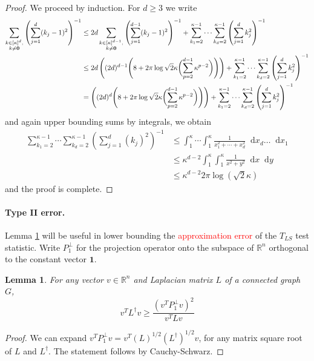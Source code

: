 \documentclass{article}
\newcommand{\Reals}{\mathbb{R}}
\newcommand{\1}{\mathbb{I}}
\newcommand{\Linv}{L^{\dagger}}
\newcommand{\dif}{\mathop{}\!\mathrm{d}}
\theoremstyle{alden}
\theoremstyle{aldenthm}
\newtheorem{lemma}{Lemma}
\theoremstyle{definition}
\theoremstyle{remark}
\begin{document}
\begin{proof}
	We proceed by induction. For $d \geq 3$ we write
	\begin{align*}
	\sum_{\substack{k \in [\kappa]^d, \\ k \neq \bf{0}}} \left(\sum_{j = 1}^{d} (k_j - 1)^2\right)^{-1} & \leq 2d \sum_{\substack{k \in [\kappa]^{d - 1}, \\ k \neq \bf{0}}} \left(\sum_{j = 1}^{d - 1} (k_j - 1)^2\right)^{-1} + \sum_{k_1 = 2}^{\kappa - 1} \cdots \sum_{k_d = 2}^{\kappa - 1} \left(\sum_{j = 1}^{d} k_j^2\right)^{-1} \\
	& \leq 2d \left( (2d)^{d - 1}\Biggl(8 + 2 \pi \log \sqrt{2} \kappa \biggl(\sum_{p = 2}^{d - 1} \kappa^{p - 2}\biggr) \Biggr)\right) + \sum_{k_1 = 2}^{\kappa - 1} \cdots \sum_{k_d = 2}^{\kappa - 1} \left(\sum_{j = 1}^{d} k_j^2\right)^{-1} \\
	& = \left( (2d)^{d}\Biggl(8 + 2 \pi \log \sqrt{2} \kappa \biggl(\sum_{p = 2}^{d - 1} \kappa^{p - 2}\biggr) \Biggr)\right) + \sum_{k_1 = 2}^{\kappa - 1} \cdots \sum_{k_d = 2}^{\kappa - 1} \left(\sum_{j = 1}^{d} k_j^2\right)^{-1} 
	\end{align*}
	and again upper bounding sums by integrals, we obtain
	\begin{align*}
	\sum_{k_1 = 2}^{\kappa - 1} \cdots \sum_{k_d = 2}^{\kappa - 1} \left(\sum_{j = 1}^{d} (k_j)^2\right)^{-1} & \leq \int_{1}^{\kappa} \cdots \int_{1}^{\kappa} \frac{1}{x_1^2 + \cdots + x_d^2} \dif x_d \ldots \dif x_1 \\
	& \leq \kappa^{d-2} \int_{1}^{\kappa} \int_{1}^{\kappa} \frac{1}{x^2 + y^2} \dif x \dif y \\
	& \leq \kappa^{d-2} 2 \pi \log(\sqrt{2} \kappa)
	\end{align*}
	and the proof is complete.
\end{proof}

\paragraph{Type II error.}

Lemma \ref{lem: approx_error_lb_1} will be useful in lower bounding the \textcolor{red}{approximation error} of the $T_{LS}$ test statistic. Write $P_1^{\perp}$ for the projection operator onto the subspace of $\Reals^n$ orthogonal to the constant vector $\mathbf{1}$.

\begin{lemma}
	\label{lem: approx_error_lb_1}
	For any vector $v \in \Reals^n$ and Laplacian matrix $L$ of a connected graph $G$,
	\begin{equation*}
	v^T \Linv v \geq \frac{(v^T P_{1}^{\perp}v)^2}{v^T L v}
	\end{equation*}
\end{lemma}
\begin{proof}
	We can expand $v^T P_1^{\perp} v  = v^T (L)^{1/2}(\Linv)^{1/2} v$, for any matrix square root of $L$ and $\Linv$. The statement follows by Cauchy-Schwarz.
\end{proof}
\end{document}
